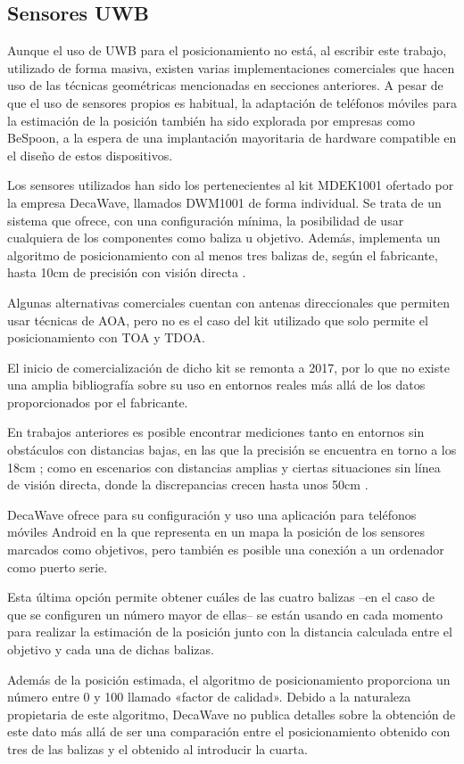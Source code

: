 \subsection{Sensores UWB}

Aunque el uso de UWB para el posicionamiento no está, al escribir este trabajo, utilizado de forma masiva, existen varias implementaciones comerciales que hacen uso de las técnicas geométricas mencionadas en secciones anteriores.
A pesar de que el uso de sensores propios es habitual, la adaptación de teléfonos móviles para la estimación de la posición también ha sido explorada por empresas como BeSpoon, a la espera de una implantación mayoritaria de hardware compatible en el diseño de estos dispositivos.

Los sensores utilizados han sido los pertenecientes al kit MDEK1001 ofertado por la empresa DecaWave, llamados DWM1001 de forma individual.
Se trata de un sistema que ofrece, con una configuración mínima, la posibilidad de usar cualquiera de los componentes como baliza u objetivo.
Además, implementa un algoritmo de posicionamiento con al menos tres balizas de, según el fabricante, hasta 10cm de precisión con visión directa \cite{Decawave}.

Algunas alternativas comerciales cuentan con antenas direccionales que permiten usar técnicas de AOA, pero no es el caso del kit utilizado que solo permite el posicionamiento con TOA y TDOA.

El inicio de comercialización de dicho kit se remonta a 2017, por lo que no existe una amplia bibliografía sobre su uso en entornos reales más allá de los datos proporcionados por el fabricante.

En trabajos anteriores es posible encontrar mediciones tanto en entornos sin obstáculos con distancias bajas, en las que la precisión se encuentra en torno a los 18cm \cite{Simedroni}; como en escenarios con distancias amplias y ciertas situaciones sin línea de visión directa, donde la discrepancias crecen hasta unos 50cm \cite{jimenez, kulmer}.

DecaWave ofrece para su configuración y uso una aplicación para teléfonos móviles Android en la que representa en un mapa la posición de los sensores marcados como objetivos, pero también es posible una conexión a un ordenador como puerto serie.

Esta última opción permite obtener cuáles de las cuatro balizas --en el caso de que se configuren un número mayor de ellas-- se están usando en cada momento para realizar la estimación de la posición junto con la distancia calculada entre el objetivo y cada una de dichas balizas.

Además de la posición estimada, el algoritmo de posicionamiento proporciona un número entre 0 y 100 llamado «factor de calidad».
Debido a la naturaleza propietaria de este algoritmo, DecaWave no publica detalles sobre la obtención de este dato más allá de ser una comparación entre el posicionamiento obtenido con tres de las balizas y el obtenido al introducir la cuarta.

